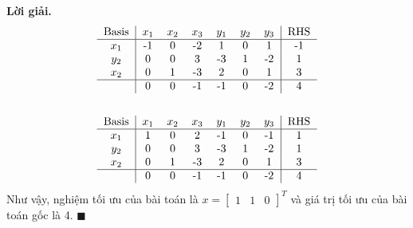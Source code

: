 \documentclass[12pt]{article}
\newenvironment{solution}{%
     \setlength\parindent{0pt}\par\medskip\textbf{Lời giải.}\quad}{%
     \hfill\tiny$\blacksquare$\par\medskip}
\begin{document}
\begin{solution}
\begin{align*}
\begin{tabular}{c|cccccc|c}
                Basis &$x_1$ & $x_2$ & $x_3$ & $y_1$ & $y_2$ & $y_3$ & RHS \\ \hline
                $x_1$ & -1 & 0 & -2 & 1 & 0 & 1 & -1 \\
                $y_2$ & 0 & 0 & 3 & -3 & 1 & -2 & 1 \\
                $x_2$ & 0 & 1 & -3 & 2 & 0 & 1 & 3 \\ \hline
                & 0 & 0 & -1 & -1 & 0 & -2 & 4 \\
            \end{tabular}
            \\
            \\
            \begin{tabular}{c|cccccc|c}
                Basis &$x_1$ & $x_2$ & $x_3$ & $y_1$ & $y_2$ & $y_3$ & RHS \\ \hline
                $x_1$ & 1 & 0 & 2 & -1 & 0 & -1 & 1 \\
                $y_2$ & 0 & 0 & 3 & -3 & 1 & -2 & 1 \\
                $x_2$ & 0 & 1 & -3 & 2 & 0 & 1 & 3 \\ \hline
                & 0 & 0 & -1 & -1 & 0 & -2 & 4 \\
            \end{tabular}
        \end{align*}
        Như vậy, nghiệm tối ưu của bài toán là $x = \begin{bmatrix} 1 & 1 & 0 \end{bmatrix}^T$ và giá trị tối ưu của bài toán gốc là 4.
    \end{solution}

    
\end{document}

